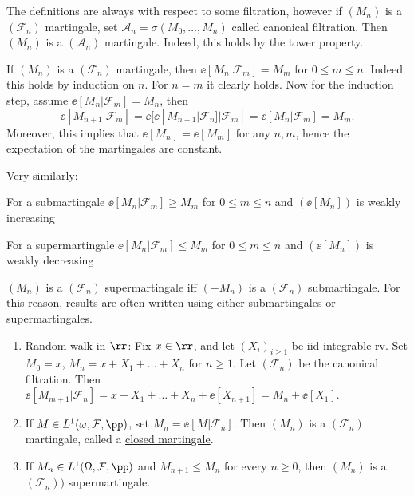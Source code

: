 \documentclass[../main.tex]{subfiles}
\begin{document}
\begin{remark}
  The definitions are always with respect to some filtration, however if $(M_n)$ 
  is a $(\mathcal{F}_n)$ martingale, set $\mathcal{A}_n = \sigma(M_0, \ldots,
  M_n)$ called canonical filtration. Then $(M_n)$ is a $(\mathcal{A}_n)$
  martingale. Indeed, this holds by the tower property.
\end{remark}
\begin{remark}
  If $(M_n)$ is a $(\mathcal{F}_n)$ martingale, then $\ee[M_n | \mathcal{F}_m] =
  M_m$ for $0 \leq m \leq n$. Indeed this holds by induction on $n$.
  For $n = m$ it clearly holds. Now for the induction step, assume $\ee[M_n |
  \mathcal{F}_m] = M_n$, then
  \[
    \ee[M_{n+1} | \mathcal{F}_m] = \ee[\ee[M_{n+1} | \mathcal{F}_n ] |
    \mathcal{F}_m] = \ee[M_n | \mathcal{F}_m] = M_{m}
  .\] 
Moreover, this implies that $\ee[M_n] = \ee[M_m]$ for any $n, m$, hence the
  expectation of the martingales are constant.

  \vspace{0.5em}
  \noindent
  Very similarly:

  For a submartingale $\ee[M_n | \mathcal{F}_m] \geq M_m$ for $0
  \leq m \leq n$ and $(\ee[M_n])$ is weakly increasing

  For a supermartingale $\ee[M_n | \mathcal{F}_m] \leq M_m$ for $0
  \leq m \leq n$ and $(\ee[M_n])$ is weakly decreasing

  \begin{remark}
    $(M_n)$ is a $(\mathcal{F}_n)$ supermartingale iff $(-M_n)$ is a
    $(\mathcal{F}_n)$ submartingale. For this reason, results are often written
    using either submartingales or supermartingales.
  \end{remark}

  \newpage
  \begin{example}
      \hfill

      \begin{enumerate}
        \item Random walk in $\rr$: Fix $x \in \rr$, and let $(X_i)_{i \geq 1}$
          be iid integrable rv. Set $M_0 = x$, $M_n = x + X_1 + \ldots + X_n$
          for $n \geq 1$. Let $(\mathcal{F}_n)$ be the canonical filtration.
          Then $\ee[M_{m+1} | \mathcal{F}_n] = x + X_1 + \ldots + X_n +
          \ee[X_{n+1}] = M_n + \ee[X_1]$.

        \item If $M \in L^1(\omega, \mathcal{F}, \pp)$, set $M_n = \ee[M |
          \mathcal{F}_n]$. Then $(M_n)$ is a $(\mathcal{F}_n)$ martingale,
          called a \underline{closed martingale}.

        \item If $M_n \in L^1 (\Omega, \mathcal{F}, \pp)$ and $M_{n+1} \leq M_n$
          for every $n \geq 0$, then $(M_n)$ is a $(\mathcal{F}_n))$
          supermartingale.
      \end{enumerate}
  \end{example}
\end{remark}
\end{document}
